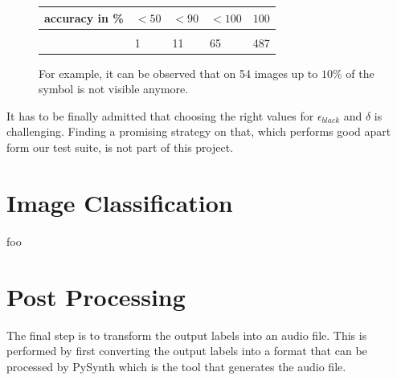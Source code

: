 \documentclass[twocolumn]{article}
\begin{document}
\begin{figure}
\begin{tabular}{l|l l l l}
 accuracy in \%  & $<50$   & $ < 90 $ &  $ < 100$ &  $100$ \\
 \hline \\
 & 1 & 11 & 65 & 487 
\end{tabular}
\caption{For example, it can be observed that on 54 images up to $10 \%$ of the symbol is not visible anymore.}
\label{quality}
\end{figure}


It has to be finally admitted that choosing the right values for $\epsilon_{black}$ and $\delta$ is challenging. Finding a promising strategy on that, which performs good apart form our test suite, is not part of this project.  





\section{Image Classification}
foo

\section{Post Processing}
The final step is to transform the output labels into an audio file. This is performed by first converting the output labels into a format that can be processed by PySynth \cite{pysynth} which is the tool that generates the audio file. 


\newpage 


  
\end{document}
